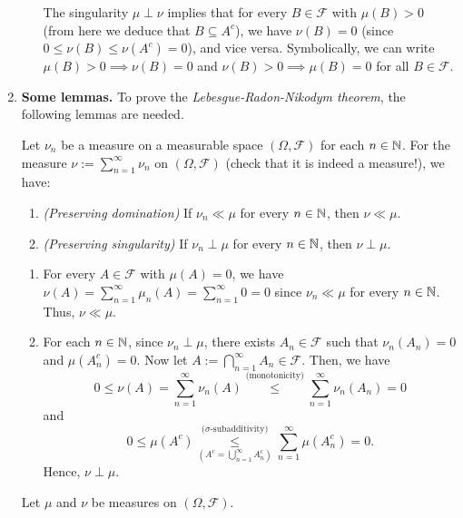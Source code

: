 \begin{enumerate}
\begin{itemize}
\begin{note}
The singularity \(\mu\perp\nu\) implies that for every \(B\in\mathcal{F}\) with
\(\mu(B)>0\) (from here we deduce that \(B\subseteq A^c\)), we have
\(\nu(B)=0\) (since \(0\le\nu(B)\le\nu(A^c)=0\)), and vice versa. Symbolically,
we can write \(\mu(B)>0\implies \nu(B)=0\) and \(\nu(B)>0\implies \mu(B)=0\) for
all \(B\in\mathcal{F}\).
\end{note}
\end{itemize}
\item \textbf{Some lemmas.} To prove the \emph{Lebesgue-Radon-Nikodym theorem},
the following lemmas are needed.
\begin{lemma}
\label{lma:meas-sum-dom-sing}
Let \(\nu_n\) be a measure on a measurable space \((\Omega,\mathcal{F})\) for
each \(n\in\mathbb{N}\). For the measure \(\nu:=\sum_{n=1}^{\infty}\nu_n\) on
\((\Omega,\mathcal{F})\) (check that it is indeed a measure!), we have:
\begin{enumerate}
\item \emph{(Preserving domination)} If \(\nu_n\ll \mu\) for every \(n\in\mathbb{N}\), then \(\nu\ll\mu\).
\item \emph{(Preserving singularity)} If \(\nu_n\perp\mu\) for every
\(n\in\mathbb{N}\), then \(\nu\perp\mu\).
\end{enumerate}
\end{lemma}
\begin{pf}
\begin{enumerate}
\item For every \(A\in\mathcal{F}\) with \(\mu(A)=0\), we have \(\nu(A)=\sum_{n=1}^{\infty}\mu_n(A)=
\sum_{n=1}^{\infty}0=0\) since \(\nu_n\ll\mu\) for every \(n\in\mathbb{N}\). Thus, \(\nu\ll\mu\).
\item For each \(n\in\mathbb{N}\), since \(\nu_n\perp\mu\), there exists
\(A_n\in\mathcal{F}\) such that \(\nu_n(A_n)=0\) and \(\mu(A_n^{c})=0\). Now
let \(A:=\bigcap_{n=1}^{\infty}A_n\in\mathcal{F}\). Then, we have
\[
0\le\nu(A)=\sum_{n=1}^{\infty}\nu_n(A)\overset{\text{(monotonicity)}}{\le}
\sum_{n=1}^{\infty}\nu_n(A_n)=0
\]
and
\[
0\le\mu(A^{c})\underset{(A^c=\bigcup_{n=1}^{\infty}A_n^{c})}{\overset{\text{(\(\sigma\)-subadditivity)}}{\le}}
\sum_{n=1}^{\infty}\mu(A_n^c)=0.
\]
Hence, \(\nu\perp\mu\).
\end{enumerate}
\end{pf}
\begin{lemma}
\label{lma:fin-meas-relate}
Let \(\mu\) and \(\nu\) be  measures on \((\Omega,\mathcal{F})\).

\end{lemma}
\end{enumerate}
